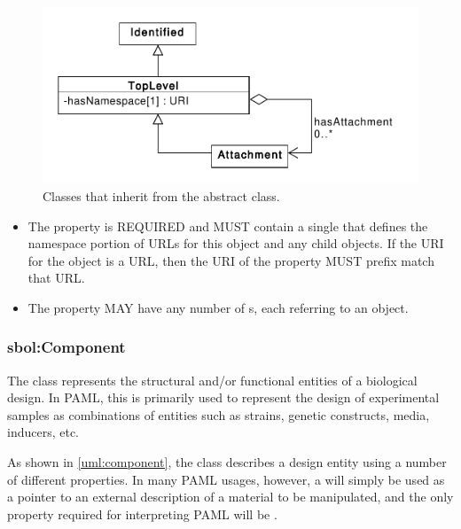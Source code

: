 \begin{figure}[ht]
\begin{center}
\includegraphics[scale=0.6]{sbol_classes/toplevel}
\caption[]{Classes that inherit from the  abstract class.}
\label{uml:toplevel}
\end{center}
\end{figure}

\begin{itemize}
\item \label{sec:sbol:hasNamespace}
The  property is REQUIRED and MUST contain a single  that defines the namespace portion of URLs for this object and any child objects.
If the URI for the  object is a URL, then the URI of the  property MUST prefix match that URL.

\item 
\label{sec:sbol:hasAttachment}
The  property MAY have any number of s, each referring to an  object.
\end{itemize}


\subsubsection{sbol:Component}
\label{sec:sbol:Component}

The  class represents the structural and/or functional entities of a biological design. 
In PAML, this is primarily used to represent the design of experimental samples as combinations of entities such as strains, genetic constructs, media, inducers, etc.

As shown in \ref{uml:component}, the  class describes a design entity using a number of different properties.
In many PAML usages, however, a  will simply be used as a pointer to an external description of a material to be manipulated, and the only property required for interpreting PAML will be .

